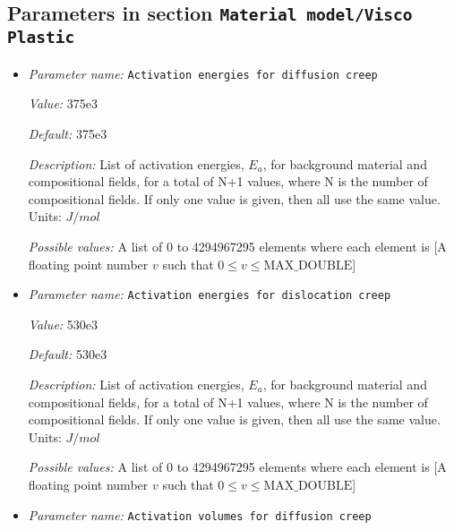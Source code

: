 \subsection{Parameters in section \tt Material model/Visco Plastic}
\label{parameters:Material_20model/Visco_20Plastic}

\begin{itemize}
\item {\it Parameter name:} {\tt Activation energies for diffusion creep}
\label{parameters:Material model/Visco Plastic/Activation energies for diffusion creep}


{\it Value:} 375e3


{\it Default:} 375e3


{\it Description:} List of activation energies, $E_a$, for background material and compositional fields, for a total of N+1 values, where N is the number of compositional fields. If only one value is given, then all use the same value.  Units: $J / mol$


{\it Possible values:} A list of 0 to 4294967295 elements where each element is [A floating point number $v$ such that $0 \leq v \leq \text{MAX\_DOUBLE}$]
\item {\it Parameter name:} {\tt Activation energies for dislocation creep}
\label{parameters:Material model/Visco Plastic/Activation energies for dislocation creep}


{\it Value:} 530e3


{\it Default:} 530e3


{\it Description:} List of activation energies, $E_a$, for background material and compositional fields, for a total of N+1 values, where N is the number of compositional fields. If only one value is given, then all use the same value.  Units: $J / mol$


{\it Possible values:} A list of 0 to 4294967295 elements where each element is [A floating point number $v$ such that $0 \leq v \leq \text{MAX\_DOUBLE}$]
\item {\it Parameter name:} {\tt Activation volumes for diffusion creep}
\label{parameters:Material model/Visco Plastic/Activation volumes for diffusion creep}



\end{itemize}
